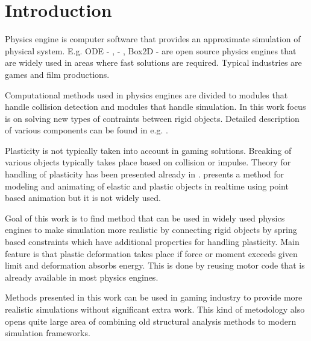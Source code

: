 \section{Introduction}

Physics engine is computer software that provides an approximate simulation of physical system. 
E.g. ODE - \cite{ode}, \bullet - \cite{bullet}, Box2D - \cite{box2d} are open source physics engines that are  widely used in 
areas where fast solutions are required. Typical industries are games and film productions.

Computational methods used in physics engines are divided to modules that handle collision detection and modules that handle simulation.
In this work focus is on solving new types of contraints between rigid objects.
Detailed description of various components can be found in e.g. \cite{erleben.thesis}.

Plasticity is not typically taken into account in gaming solutions. 
Breaking of various objects typically takes place based on collision or impulse.
Theory for handling of plasticity has been presented already in \cite{cg1988}. \cite{muller2004point} presents a method for modeling and animating of elastic and plastic objects in realtime using point based animation but it is not widely used.

Goal of this work is to find method that can be used in widely used physics engines to make simulation more realistic
by connecting rigid objects by  spring based constraints which have additional properties for handling plasticity.
Main feature is that plastic deformation takes place if force or moment exceeds given limit and deformation absorbs energy.
This is done by reusing motor code that is already available in most physics engines.

Methods presented in this work can be used in gaming industry to provide more realistic simulations without significant extra work. 
This kind of metodology also opens quite large area of combining old structural analysis methods to modern simulation frameworks.
